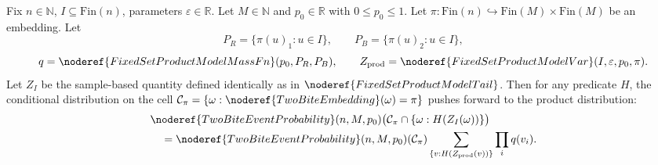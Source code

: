 \begin{helper}
Fix \(n\in\mathbb N\), \(I\subseteq\mathrm{Fin}(n)\), parameters \(\varepsilon\in\mathbb R\).
Let \(M\in\mathbb N\) and \(p_0\in\mathbb R\) with \(0\le p_0\le1\).
Let \(\pi:\mathrm{Fin}(n)\hookrightarrow\mathrm{Fin}(M)\times\mathrm{Fin}(M)\) be an embedding.
Let
\[
P_R=\{\pi(u)_1:u\in I\},\qquad P_B=\{\pi(u)_2:u\in I\},
\]
\[
q=\noderef{FixedSetProductModelMassFn}(p_0,P_R,P_B),
\qquad
Z_{\mathrm{prod}}=\noderef{FixedSetProductModelVar}(I,\varepsilon,p_0,\pi).
\]
Let \(Z_I\) be the sample-based quantity defined identically as in \(\noderef{FixedSetProductModelTail}\).
Then for any predicate \(H\), the conditional distribution on the cell \(\mathcal C_\pi = \{\omega:\noderef{TwoBiteEmbedding}(\omega)=\pi\}\) pushes forward to the product distribution:
\[
\begin{aligned}
&\noderef{TwoBiteEventProbability}(n,M,p_0)
 \bigl(\mathcal C_\pi\cap \{\omega:H(Z_I(\omega))\}\bigr)\\
&\quad=
\noderef{TwoBiteEventProbability}(n,M,p_0)(\mathcal C_\pi)
 \sum_{\{v:H(Z_{\mathrm{prod}}(v))\}}\prod_iq(v_i).
\end{aligned}
\]
\end{helper}
